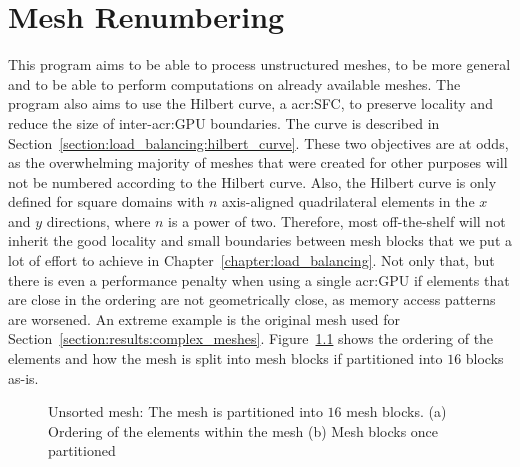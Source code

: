 \chapter{Mesh Renumbering}\label{chapter:renumbering}

This program aims to be able to process unstructured meshes, to be more general and to be able to
perform computations on already available meshes. The program also aims to use the Hilbert curve, a
\acrlong{acr:SFC}, to preserve locality and reduce the size of inter-\acrshort{acr:GPU} boundaries.
The curve is described in Section~\ref{section:load_balancing:hilbert_curve}. These two objectives
are at odds, as the overwhelming majority of meshes that were created for other purposes will not be
numbered according to the Hilbert curve. Also, the Hilbert curve is only defined for square domains
with \(n\) axis-aligned quadrilateral elements in the \(x\) and \(y\) directions, where \(n\) is a
power of two. Therefore, most off-the-shelf will not inherit the good locality and small boundaries
between mesh blocks that we put a lot of effort to achieve in Chapter~\ref{chapter:load_balancing}.
Not only that, but there is even a performance penalty when using a single \acrshort{acr:GPU} if
elements that are close in the ordering are not geometrically close, as memory access patterns are
worsened. An extreme example is the original mesh used for
Section~\ref{section:results:complex_meshes}. Figure~\ref{fig:mesh_unsorted} shows the ordering of
the elements and how the mesh is split into mesh blocks if partitioned into \(16\) blocks as-is. 

\begin{figure}[H]
	\centering
	\caption{Unsorted mesh: The mesh is partitioned into \(16\) mesh blocks. (a) Ordering of the elements within the mesh (b) Mesh blocks once partitioned}\label{fig:mesh_unsorted}
\end{figure}

